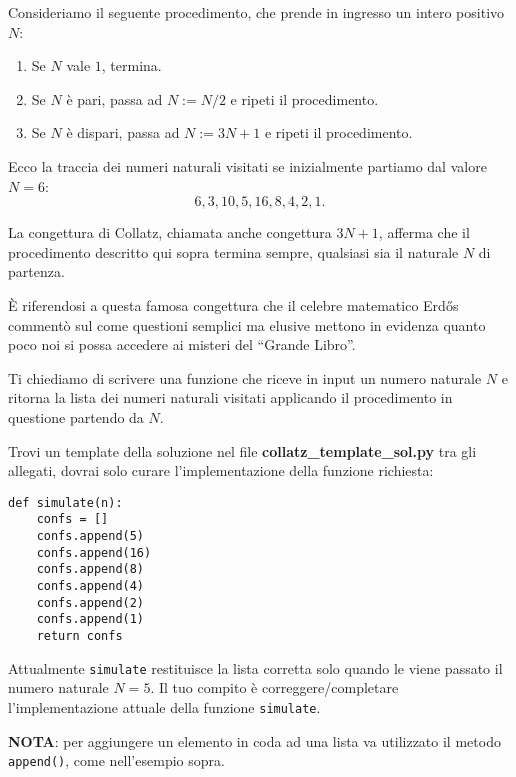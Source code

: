 \makeatletter
\renewcommand{\this@inputfilename}{\texttt{stdin}}
\renewcommand{\this@outputfilename}{\texttt{stdout}}
\makeatother


\medskip

Consideriamo il seguente procedimento, che prende in ingresso un intero positivo $N$:
\begin{enumerate}
\item Se $N$ vale $1$, termina.
\item Se $N$ è pari, passa ad $N := N/2$ e ripeti il procedimento.
\item Se $N$ è dispari, passa ad $N := 3N +1$ e ripeti il procedimento.
\end{enumerate}

Ecco la traccia dei numeri naturali visitati se inizialmente partiamo dal valore $N=6$:
$$6, 3, 10, 5, 16, 8, 4, 2, 1.$$

La congettura di Collatz, chiamata anche congettura $3N+1$, afferma che il procedimento 
descritto qui sopra termina sempre, qualsiasi sia il naturale $N$ di partenza.

È riferendosi a questa famosa congettura che il celebre matematico Erdős commentò 
sul come questioni semplici ma elusive mettono in evidenza quanto poco noi si possa 
accedere ai misteri del ``Grande Libro''.

Ti chiediamo di scrivere una funzione che riceve in input un numero naturale $N$ 
e ritorna la lista dei numeri naturali visitati applicando il procedimento in questione partendo da $N$.

Trovi un template della soluzione nel file \textbf{collatz\_template\_sol.py} tra 
gli allegati, dovrai solo curare l'implementazione della funzione richiesta:

\begin{verbatim}
def simulate(n):
    confs = []
    confs.append(5)
    confs.append(16)
    confs.append(8)
    confs.append(4)
    confs.append(2)
    confs.append(1)
    return confs
\end{verbatim}

Attualmente {\tt simulate} restituisce la lista corretta solo quando le viene passato 
il numero naturale $N=5$. Il tuo compito è correggere/completare l'implementazione 
attuale della funzione {\tt simulate}. 

\textbf{NOTA}: per aggiungere un elemento in coda ad una lista va utilizzato 
il metodo \texttt{append()}, come nell'esempio sopra.

